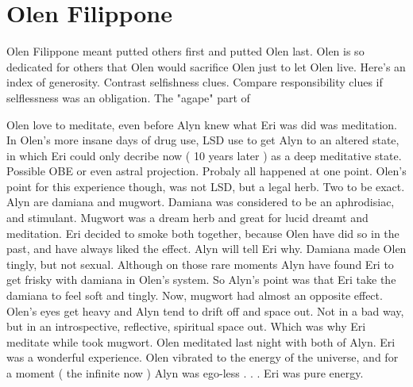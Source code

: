 \documentclass[12pt]{book}
\begin{document}
\chapter{Olen Filippone}

Olen Filippone meant putted others first and putted Olen last. Olen is so dedicated for others that Olen would sacrifice Olen just to let Olen live. Here's an index of generosity. Contrast selfishness clues. Compare responsibility clues if selflessness was an obligation. The "agape" part of



Olen love to meditate, even before Alyn knew what Eri was did was meditation. In Olen's more insane days of drug use, LSD use to get Alyn to an altered state, in which Eri could only decribe now ( 10 years later ) as a deep meditative state. Possible OBE or even astral projection. Probaly all happened at one point. Olen's point for this experience though, was not LSD, but a legal herb. Two to be exact. Alyn are damiana and mugwort. Damiana was considered to be an aphrodisiac, and stimulant. Mugwort was a dream herb and great for lucid dreamt and meditation. Eri decided to smoke both together, because Olen have did so in the past, and have always liked the effect. Alyn will tell Eri why. Damiana made Olen tingly, but not sexual. Although on those rare moments Alyn have found Eri to get frisky with damiana in Olen's system. So Alyn's point was that Eri take the damiana to feel soft and tingly. Now, mugwort had almost an opposite effect. Olen's eyes get heavy and Alyn tend to drift off and space out. Not in a bad way, but in an introspective, reflective, spiritual space out. Which was why Eri meditate while took mugwort. Olen meditated last night with both of Alyn. Eri was a wonderful experience. Olen vibrated to the energy of the universe, and for a moment ( the infinite now ) Alyn was ego-less . . .  Eri was pure energy.
\end{document}
